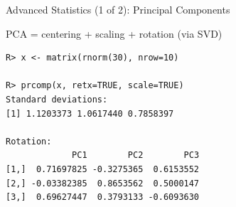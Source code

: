 \begin{frame}[fragile]
  \begin{exampleblock}{Advanced Statistics (1 of 2): Principal Components}\pause
  \begin{center}
    PCA = centering + scaling + rotation (via SVD)
  \end{center}
  
\begin{lstlisting}[backgroundcolor=\color{white},basicstyle=\ttfamily\color{
dkgray}\scriptsize,keywordstyle=\color{black}, 
  commentstyle=\color{orange},stringstyle=\color{mauve}]
R> x <- matrix(rnorm(30), nrow=10)

R> prcomp(x, retx=TRUE, scale=TRUE)
Standard deviations:
[1] 1.1203373 1.0617440 0.7858397

Rotation:
             PC1        PC2        PC3
[1,]  0.71697825 -0.3275365  0.6153552
[2,] -0.03382385  0.8653562  0.5000147
[3,]  0.69627447  0.3793133 -0.6093630
\end{lstlisting}
  \end{exampleblock}
\end{frame}

